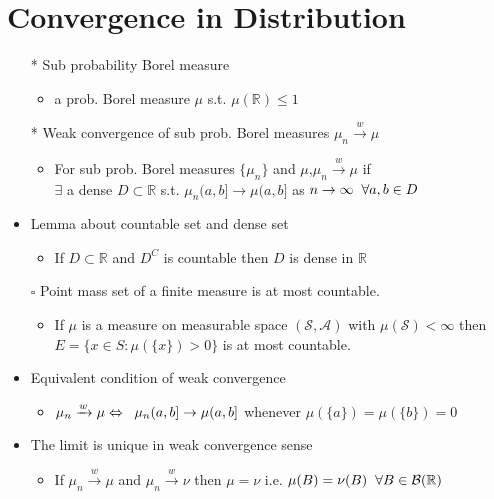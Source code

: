 \documentclass[12pt, A4]{article}
\begin{document}
\clearpage
\section{Convergence in Distribution}
\begin{itemize}
	\item[*] Sub probability Borel measure
	\begin{itemize}
		\item a prob. Borel measure $\mu$ s.t. $\mu(\mathbb{R})\leq1$
	\end{itemize}
	\item[*] Weak convergence of sub prob. Borel measures $\mu_n\xrightarrow{w}\mu$
	\begin{itemize}
		\item For sub prob. Borel measures $\{\mu_n\}$ and $\mu$,\quad $\mu_n\xrightarrow{w}\mu$ if \\$\exists$ a dense $D\subset \mathbb{R}$ s.t. $\mu_n(a,b]\rightarrow\mu(a,b]$ as $n\rightarrow \infty \hspace{0.2cm} \forall a,b\in D$
	\end{itemize}
	\item Lemma about countable set and dense set
	\begin{itemize}
		\item If $D\subset \mathbb{R}$ and $D^C$ is countable then $D$ is dense in $\mathbb{R}$
	\end{itemize}
	\item[$\square$] Point mass set of a finite measure is at most countable.
	\begin{itemize}
		\item If $\mu$ is a measure on measurable space $(\mathcal{S},\mathcal{A})$ with $\mu(\mathcal{S})<\infty$ then\\ $E=\{x\in S : \mu(\{x\})>0\}$ is at most countable. 
	\end{itemize}
	\item Equivalent condition of weak convergence
	\begin{itemize}
		\item $\mu_n\xrightarrow{w}\mu \Leftrightarrow \hspace{0.2cm} \mu_n(a,b]\rightarrow \mu(a,b]$ whenever $\mu(\{a\})=\mu(\{b\})=0$
	\end{itemize}
	\item The limit is unique in weak convergence sense
	\begin{itemize}
		\item If $\mu_n\xrightarrow{w} \mu$ and $\mu_n\xrightarrow{w} \nu$ \hspace{0.1cm} then $\mu=\nu$\hspace{0.1cm} i.e.\hspace{0.1cm} $\mu(B)=\nu(B) \hspace{0.2cm} \forall B\in \mathcal{B}(\mathbb{R})$

\end{itemize}
\end{itemize}
\end{document}
